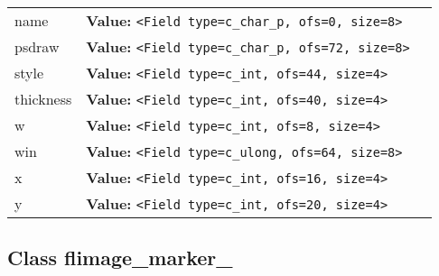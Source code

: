 \begin{longtable}{|p{\varnamewidth}|p{\vardescrwidth}|l}
\cline{1-2}
\raggedright n\-a\-m\-e\- & \raggedright \textbf{Value:} 
{\tt {\textless}Field type=c\_char\_p, ofs=0, size=8{\textgreater}}&\\
\cline{1-2}
\raggedright p\-s\-d\-r\-a\-w\- & \raggedright \textbf{Value:} 
{\tt {\textless}Field type=c\_char\_p, ofs=72, size=8{\textgreater}}&\\
\cline{1-2}
\raggedright s\-t\-y\-l\-e\- & \raggedright \textbf{Value:} 
{\tt {\textless}Field type=c\_int, ofs=44, size=4{\textgreater}}&\\
\cline{1-2}
\raggedright t\-h\-i\-c\-k\-n\-e\-s\-s\- & \raggedright \textbf{Value:} 
{\tt {\textless}Field type=c\_int, ofs=40, size=4{\textgreater}}&\\
\cline{1-2}
\raggedright w\- & \raggedright \textbf{Value:} 
{\tt {\textless}Field type=c\_int, ofs=8, size=4{\textgreater}}&\\
\cline{1-2}
\raggedright w\-i\-n\- & \raggedright \textbf{Value:} 
{\tt {\textless}Field type=c\_ulong, ofs=64, size=8{\textgreater}}&\\
\cline{1-2}
\raggedright x\- & \raggedright \textbf{Value:} 
{\tt {\textless}Field type=c\_int, ofs=16, size=4{\textgreater}}&\\
\cline{1-2}
\raggedright y\- & \raggedright \textbf{Value:} 
{\tt {\textless}Field type=c\_int, ofs=20, size=4{\textgreater}}&\\
\cline{1-2}
\end{longtable}



\subsection{Class flimage\_marker\_}

